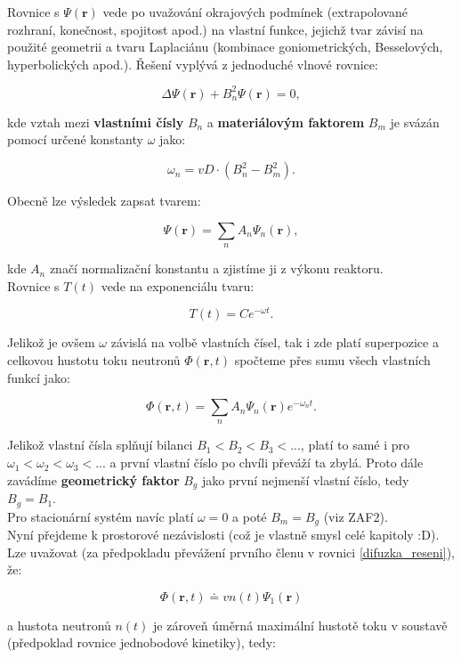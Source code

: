 Rovnice s $\Psi (\textbf{r})$ vede po uvažování okrajových podmínek (extrapolované rozhraní, konečnost, spojitost apod.) na vlastní funkce, jejichž tvar závisí na použité geometrii a tvaru Laplaciánu (kombinace goniometrických, Besselových, hyperbolických apod.). Řešení vyplývá z jednoduché vlnové rovnice:

$$ \Delta \Psi (\textbf{r}) + B_n^2 \Psi (\textbf{r}) = 0, $$

kde vztah mezi \textbf{vlastními čísly} $B_n$ a \textbf{materiálovým faktorem} $B_m$ je svázán pomocí určené konstanty $\omega$ jako:

$$ \omega_n = vD \cdot (B_n^2-B_m^2). $$

Obecně lze výsledek zapsat tvarem:

$$ \Psi (\textbf{r}) = \sum_n A_n \Psi_n (\textbf{r}), $$

kde $A_n$ značí normalizační konstantu a zjistíme ji z výkonu reaktoru.\\

Rovnice s $T(t)$ vede na exponenciálu tvaru:

$$ T(t) = C e^{- \omega t}. $$

Jelikož je ovšem $\omega$ závislá na volbě vlastních čísel, tak i zde platí superpozice a celkovou hustotu toku neutronů $\Phi (\textbf{r}, t)$ spočteme přes sumu všech vlastních funkcí jako:

\begin{equation}
  \Phi (\textbf{r}, t) = \sum_n A_n \Psi_n (\textbf{r}) e^{- \omega_n t}.
  \label{difuzka_reseni}
\end{equation}

Jelikož vlastní čísla splňují bilanci $B_1 < B_2 < B_3 < ...$, platí to samé i pro $\omega_1 < \omega_2 < \omega_3 < ...$ a první vlastní číslo po chvíli převáží ta zbylá. Proto dále zavádíme \textbf{geometrický faktor} $B_g$ jako první nejmenší vlastní číslo, tedy $B_g = B_1$.\\

Pro stacionární systém navíc platí $\omega = 0$ a poté $B_m = B_g$ (viz ZAF2).\\

Nyní přejdeme k prostorové nezávislosti (což je vlastně smysl celé kapitoly :D). Lze uvažovat (za předpokladu převážení prvního členu v rovnici \eqref{difuzka_reseni}), že:

$$ \Phi (\textbf{r}, t) \doteq v n(t) \Psi_1 (\textbf{r}) $$

a hustota neutronů $n(t)$ je zároveň úměrná maximální hustotě toku v soustavě (předpoklad rovnice jednobodové kinetiky), tedy:

